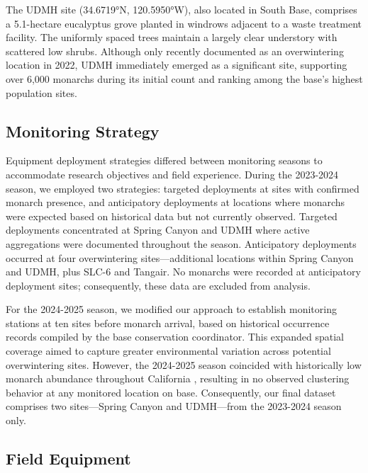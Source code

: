 The UDMH site (34.6719°N, 120.5950°W), also located in South Base, comprises a 5.1-hectare eucalyptus grove planted in windrows adjacent to a waste treatment facility. The uniformly spaced trees maintain a largely clear understory with scattered low shrubs. Although only recently documented as an overwintering location in 2022, UDMH immediately emerged as a significant site, supporting over 6,000 monarchs during its initial count and ranking among the base's highest population sites.


\subsection{Monitoring Strategy}

Equipment deployment strategies differed between monitoring seasons to accommodate research objectives and field experience. During the 2023-2024 season, we employed two strategies: targeted deployments at sites with confirmed monarch presence, and anticipatory deployments at locations where monarchs were expected based on historical data but not currently observed. Targeted deployments concentrated at Spring Canyon and UDMH where active aggregations were documented throughout the season. Anticipatory deployments occurred at four overwintering sites—additional locations within Spring Canyon and UDMH, plus SLC-6 and Tangair. No monarchs were recorded at anticipatory deployment sites; consequently, these data are excluded from analysis.

For the 2024-2025 season, we modified our approach to establish monitoring stations at ten sites before monarch arrival, based on historical occurrence records compiled by the base conservation coordinator. This expanded spatial coverage aimed to capture greater environmental variation across potential overwintering sites. However, the 2024-2025 season coincided with historically low monarch abundance throughout California \autocite{xerces_society_western_2025}, resulting in no observed clustering behavior at any monitored location on base. Consequently, our final dataset comprises two sites—Spring Canyon and UDMH—from the 2023-2024 season only.

\subsection{Field Equipment}

